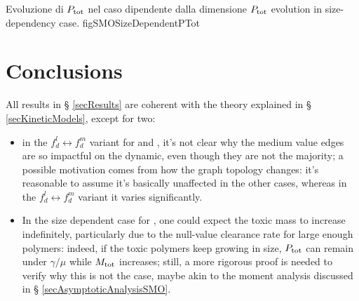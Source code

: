 \documentclass{article}
\begin{document}
                    {}
                    {\selezionaLingua
                        {Evoluzione di $P_{\text{tot}}$ nel caso dipendente dalla dimensione}
                        {$P_{\text{tot}}$ evolution in size-dependency case}.}
                    {\linewidth}
                    {figSMOSizeDependentPTot}



    \section{Conclusions}\label{secConclusions}

        All results in § \ref{secResults} are coherent with the theory explained in § \ref{secKineticModels}, except for two:

        \begin{itemize}[%
            topsep=7.5pt,     %
            itemsep=-1pt,	  %
            leftmargin=20pt,  %
            rightmargin=0pt,  %
        ]
            \item in the $f_d^l\leftrightarrow f_d^m$ variant for \FKdiscrete{} and \HDdiscrete{}, it's not clear why the medium value edges are so impactful on the dynamic, even though they are not the majority; a possible motivation comes from how the graph topology changes: it's reasonable to assume it's basically unaffected in the other cases, whereas in the $f_d^l\leftrightarrow f_d^m$ variant it varies significantly.
            
            \item In the size dependent case for \SMOdiscrete{}, one could expect the toxic mass to increase indefinitely, particularly due to the null-value clearance rate for large enough polymers: indeed, if the toxic polymers keep growing in size, $P_{\text{tot}}$ can remain under $\gamma/\mu$ while $M_{\text{tot}}$ increases; still, a more rigorous proof is needed to verify why this is not the case, maybe akin to the moment analysis discussed in § \ref{secAsymptoticAnalysisSMO}.
        \end{itemize}
        
\end{document}
